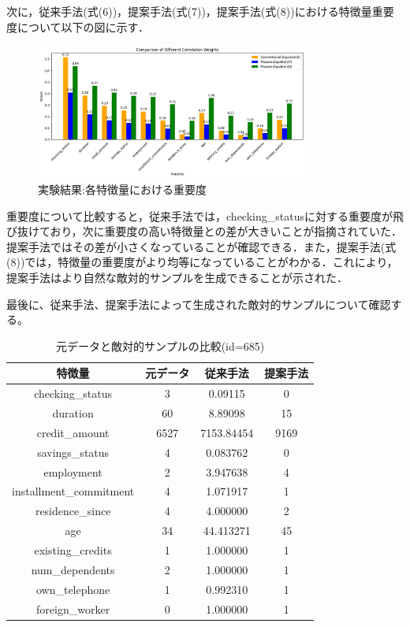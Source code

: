 次に，従来手法(式(6))，提案手法(式(7))，提案手法(式(8))における特徴量重要度について以下の図に示す．
\begin{figure}[H]
    \centering
    \includegraphics[width=0.8\textwidth]{images/実験_重要度算出の結果.png}
    \caption{実験結果:各特徴量における重要度}
    \label{fig:adversarial_example}
\end{figure}
重要度について比較すると，従来手法では，checking\_statusに対する重要度が飛び抜けており，次に重要度の高い特徴量との差が大きいことが指摘されていた．提案手法ではその差が小さくなっていることが確認できる．また，提案手法(式(8))では，特徴量の重要度がより均等になっていることがわかる．これにより，提案手法はより自然な敵対的サンプルを生成できることが示された．

最後に、従来手法、提案手法によって生成された敵対的サンプルについて確認する。
\begin{table}[H]
    \centering
    \caption{元データと敵対的サンプルの比較(id=685)}
    \begin{tabular}{|c|c|c|c|} \hline
        特徴量 & 元データ & 従来手法 & 提案手法 \\ \hline
        checking\_status & 3 & 0.09115 & 0\\ \hline
        duration & 60 & 8.89098 & 15 \\ \hline
        credit\_amount & 6527 & 7153.84454 & 9169 \\ \hline
        savings\_status & 4 & 0.083762 & 0\\ \hline
        employment & 2 & 3.947638  & 4 \\ \hline
        installment\_commitment & 4 & 1.071917 & 1\\ \hline
        residence\_since & 4 & 4.000000 & 2 \\ \hline
        age & 34 & 44.413271 & 45 \\ \hline
        existing\_credits & 1 & 1.000000 & 1 \\ \hline
        num\_dependents & 2 & 1.000000 & 1 \\ \hline
        own\_telephone & 1 & 0.992310 & 1 \\ \hline
        foreign\_worker & 0 & 1.000000 & 1 \\ \hline
    \end{tabular}
\end{table}

